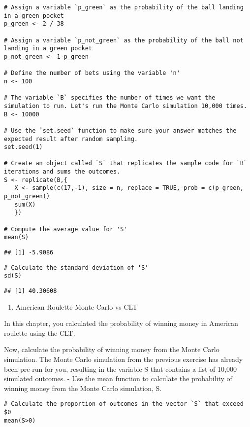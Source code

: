 \documentclass[
]{article}
\providecommand{\tightlist}{%
  \setlength{\itemsep}{0pt}\setlength{\parskip}{0pt}}
\begin{document}
\begin{verbatim}
# Assign a variable `p_green` as the probability of the ball landing in a green pocket
p_green <- 2 / 38

# Assign a variable `p_not_green` as the probability of the ball not landing in a green pocket
p_not_green <- 1-p_green

# Define the number of bets using the variable 'n'
n <- 100

# The variable `B` specifies the number of times we want the simulation to run. Let's run the Monte Carlo simulation 10,000 times.
B <- 10000

# Use the `set.seed` function to make sure your answer matches the expected result after random sampling.
set.seed(1)

# Create an object called `S` that replicates the sample code for `B` iterations and sums the outcomes.
S <- replicate(B,{
   X <- sample(c(17,-1), size = n, replace = TRUE, prob = c(p_green, p_not_green))
   sum(X)
   })

# Compute the average value for 'S'
mean(S)
\end{verbatim}

\begin{verbatim}
## [1] -5.9086
\end{verbatim}

\begin{verbatim}
# Calculate the standard deviation of 'S'
sd(S)
\end{verbatim}

\begin{verbatim}
## [1] 40.30608
\end{verbatim}

\begin{enumerate}
\def\labelenumi{\arabic{enumi}.}
\setcounter{enumi}{2}
\tightlist
\item
  American Roulette Monte Carlo vs CLT
\end{enumerate}

In this chapter, you calculated the probability of winning money in
American roulette using the CLT.

Now, calculate the probability of winning money from the Monte Carlo
simulation. The Monte Carlo simulation from the previous exercise has
already been pre-run for you, resulting in the variable S that contains
a list of 10,000 simulated outcomes. - Use the mean function to
calculate the probability of winning money from the Monte Carlo
simulation, S.

\begin{verbatim}
# Calculate the proportion of outcomes in the vector `S` that exceed $0
mean(S>0)
\end{verbatim}
\end{document}
